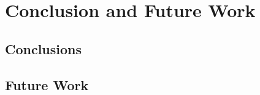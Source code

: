 \chapter{Conclusion and Future Work}
\label{ch:conclusion}

\section{Conclusions}
\label{sec:conclusions}

\section{Future Work}
\label{sec:futurework}
